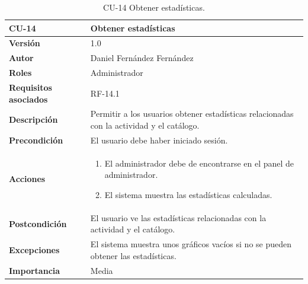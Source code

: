 \begin{table}[p]
        \centering
        \begin{tabularx}{\linewidth}{ p{} p{} }
            \toprule
            \textbf{CU-14} & \textbf{Obtener estadísticas}\\
            \toprule
            \textbf{Versión} & 1.0 \\
            \textbf{Autor} & Daniel Fernández Fernández \\
            \textbf{Roles} & Administrador \\
            \textbf{Requisitos asociados} & RF-14.1 \\
            \textbf{Descripción} & Permitir a los usuarios obtener estadísticas relacionadas con la actividad y el catálogo. \\
            \textbf{Precondición} & El usuario debe haber iniciado sesión. \\
            \textbf{Acciones} &
            \begin{enumerate}
            \def\labelenumi{\arabic{enumi}.}
            \tightlist
            \item El administrador debe de encontrarse en el panel de administrador.
            \item El sistema muestra las estadísticas calculadas.
            \end{enumerate}\\
            \textbf{Postcondición} & El usuario ve las estadísticas relacionadas con la actividad y el catálogo. \\
            \textbf{Excepciones} & El sistema muestra unos gráficos vacíos si no se pueden obtener las estadísticas. \\
            \textbf{Importancia} & Media \\
            \bottomrule
        \end{tabularx}
        \caption{CU-14 Obtener estadísticas.}
\end{table}


